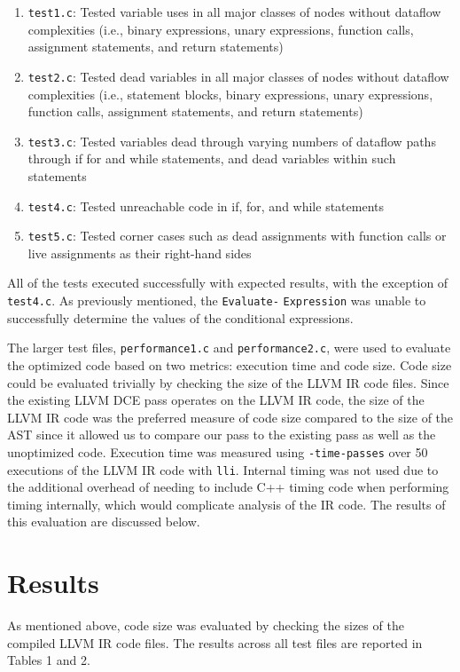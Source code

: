 \documentclass[sigconf]{acmart}
\begin{document}
\begin{enumerate}
    \item \verb|test1.c|: Tested variable uses in all major classes of nodes without dataflow complexities (i.e., binary expressions, unary expressions, function calls, assignment statements, and return statements)
    \item \verb|test2.c|: Tested dead variables in all major classes of nodes without dataflow complexities (i.e., statement blocks, binary expressions, unary expressions, function calls, assignment statements, and return statements)
    \item \verb|test3.c|: Tested variables dead through varying numbers of dataflow paths through if for and while statements, and dead variables within such statements
    \item \verb|test4.c|: Tested unreachable code in if, for, and while statements
    \item \verb|test5.c|: Tested corner cases such as dead assignments with function calls or live assignments as their right-hand sides
\end{enumerate}

All of the tests executed successfully with expected results, with the exception of \verb|test4.c|. As previously mentioned, the \verb|Evaluate-| \verb|Expression| was unable to successfully determine the values of the conditional expressions.

The larger test files, \verb|performance1.c| and \verb|performance2.c|, were used to evaluate the optimized code based on two metrics: execution time and code size. Code size could be evaluated trivially by checking the size of the LLVM IR code files. Since the existing LLVM DCE pass operates on the LLVM IR code, the size of the LLVM IR code was the preferred measure of code size compared to the size of the AST since it allowed us to compare our pass to the existing pass as well as the unoptimized code. Execution time was measured using \verb|-time-passes| over 50 executions of the LLVM IR code with \verb|lli|. Internal timing was not used due to the additional overhead of needing to include C++ timing code when performing timing internally, which would complicate analysis of the IR code. The results of this evaluation are discussed below.

\section{Results}
As mentioned above, code size was evaluated by checking the sizes of the compiled LLVM IR code files. The results across all test files are reported in Tables 1 and 2.
\end{document}

